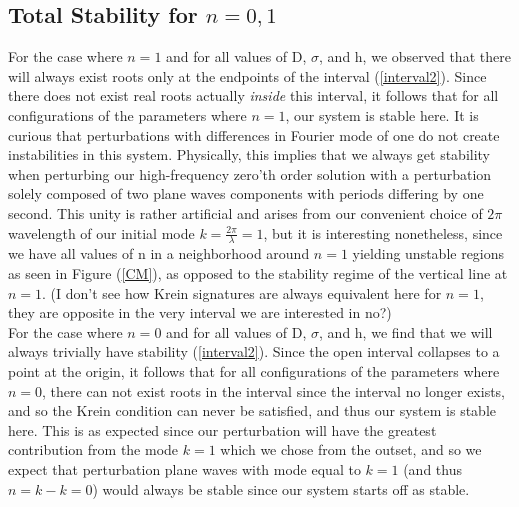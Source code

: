 \documentclass{article}
\begin{document}
\subsection{Total Stability for \(n = 0,1\)}
For the case where \(n = 1\) and for all values of D, \(\sigma\), and h, we observed that there will always exist roots only at the endpoints of the interval (\ref{interval2}). Since there does not exist real roots actually \emph{inside} this interval, it follows that for all configurations of the parameters where \(n = 1\), our system is stable here. It is curious that perturbations with differences in Fourier mode of one do not create instabilities in this system. Physically, this implies that we always get stability when perturbing our high-frequency zero'th order solution with a perturbation solely composed of two plane waves components with periods differing by one second. This unity is rather artificial and arises from our convenient choice of \(2\pi\) wavelength of our initial mode \(k = \frac{2\pi}{\lambda} = 1\), but it is interesting nonetheless, since we have all values of n in a neighborhood around \(n = 1\) yielding unstable regions as seen in Figure (\ref{CM}), as opposed to the stability regime of the vertical line at \(n = 1\). (I don't see how Krein signatures are always equivalent here for \(n = 1\), they are opposite in the very interval we are interested in no?) 
\\

For the case where \(n = 0\) and for all values of D, \(\sigma\), and h, we find that we will always trivially have stability (\ref{interval2}). Since the open interval collapses to a point at the origin, it follows that for all configurations of the parameters where \(n = 0\), there can not exist roots in the interval since the interval no longer exists, and so the Krein condition can never be satisfied, and thus our system is stable here. This is as expected since our perturbation will have the greatest contribution from the mode \(k = 1\) which we chose from the outset, and so we expect that perturbation plane waves with mode equal to \(k = 1\) (and thus \(n=k-k=0\)) would always be stable since our system starts off as stable. 
\\
\\
\end{document}
